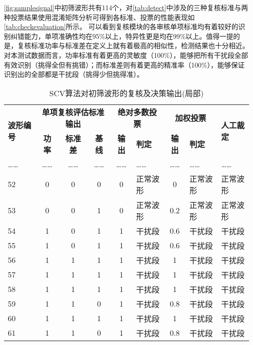 \autoref{fig:samplesignal}中初筛波形共有114个，对\autoref{tab:detect}中涉及的三种复核标准与两种投票结果使用混淆矩阵分析可得到各标准、投票的性能表现如\autoref{tab:checkevaluation}所示。
可以看到复核模块的各审核单项标准均有着较好的识别纠错能力，单项准确性均在95\%以上，特异性更是均在99\%以上。值得一提的是，复核标准功率与标准差在定义上就有着极高的相似性，检测结果也十分相近。
对本测试数据而言，功率标准有着更高的灵敏度（100\%），能够把所有干扰段全部有效识别（挑得全但有挑错）；而标准差则有着更高的精准率（100\%），能够保证识别出的全部都是干扰段（挑得少但挑得准）。
\begin{table}[htbp]
    \centering
    \caption{\label{tab:detect}SCV算法对初筛波形的复核及决策输出(局部)}
    \begin{tabularx}{\linewidth}{X<{\centering}ccccX<{\centering}cX<{\centering}X<{\centering}}
    \toprule
    \multirow{2}[4]{*}{\textbf{波形编号}} & \multicolumn{3}{c}{\textbf{单项复核评估标准输出}} & \multicolumn{2}{c}{\textbf{绝对多数投票}} & \multicolumn{2}{c}{\textbf{加权投票}} & \multirow{2}[2]{*}{\textbf{人工裁定}}\\
    \cmidrule{2-8} & \textbf{功率} & \textbf{标准差} & \textbf{基线} & \textbf{输出} & \textbf{判定} & \textbf{输出} & \textbf{判定} \\
    \midrule
    ……    & ……    & ……    & ……    & ……    & ……    & ……    & …… & ……\\
    52    & 0     & 0     & 0     & 0     & 正常波形  & 0     & 正常波形 & 正常波形\\
    53    & 0     & 0     & 1     & 0     & 正常波形  & 0.2   & 正常波形 & 正常波形\\
    54    & 1     & 0     & 1     & 1     & 干扰段   & 0.6   & 干扰段 & 干扰段\\
    55    & 1     & 0     & 1     & 1     & 干扰段   & 0.6   & 干扰段 & 干扰段\\
    56    & 1     & 1     & 1     & 1     & 干扰段   & 1     & 干扰段 & 干扰段\\
    57    & 1     & 1     & 1     & 1     & 干扰段   & 1     & 干扰段 & 干扰段\\
    58    & 1     & 1     & 1     & 1     & 干扰段   & 1     & 干扰段 & 干扰段\\
    59    & 1     & 1     & 0     & 1     & 干扰段   & 0.8   & 干扰段 & 干扰段\\
    60    & 1     & 1     & 1     & 1     & 干扰段   & 1     & 干扰段 & 干扰段\\
    61    & 1     & 1     & 0     & 1     & 干扰段   & 0.8   & 干扰段 & 干扰段\\

\end{tabularx}
\end{table}
